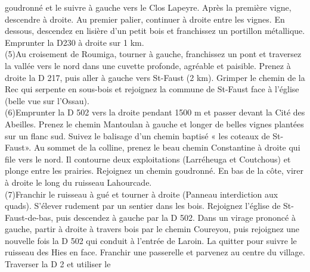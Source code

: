 \documentclass{article}
\begin{document}
                                goudronné et le suivre à gauche vers le Clos Lapeyre. Après la
                                première vigne, descendre à droite. Au premier palier, continuer à
                                droite entre les vignes. En dessous, descendez en lisière d'un petit
                                bois et franchissez un portillon métallique. Emprunter la D230 à
                                droite sur 1 km. \\(5)\indent Au croisement de Roumiga, tourner à gauche, franchissez
                                un pont et traversez la vallée vers le nord dans une cuvette
                                profonde, agréable et paisible. Prenez à droite la D 217, puis aller
                                à gauche vers St-Faust (2 km). Grimper le chemin de la Rec qui
                                serpente en sous-bois et rejoignez la commune de St-Faust face à
                                l'église (belle vue sur l'Ossau). \\(6)\indent Emprunter la D 502 vers la droite pendant 1500 m et
                                passer devant la Cité des Abeilles. Prenez le chemin Mantoulan à
                                gauche et longer de belles vignes plantées sur un flanc sud. Suivez
                                le balisage d'un chemin baptisé « les coteaux de St-Faust». Au
                                sommet de la colline, prenez le beau chemin Constantine à droite qui
                                file vers le nord. Il contourne deux exploitations (Larréheuga et
                                Coutchous) et plonge entre les prairies. Rejoignez un chemin
                                goudronné. En bas de la côte, virer à droite le long du ruisseau
                                Lahourcade. \\(7)\indent Franchir le ruisseau à gué et tourner à droite (Panneau
                                interdiction aux quads). S'élever rudement par un sentier dans les
                                bois. Rejoignez l'église de St-Faust-de-bas, puis descendez à gauche
                                par la D 502. Dans un virage prononcé à gauche, partir à droite à
                                travers bois par le chemin Coureyou, puis rejoignez une nouvelle
                                fois la D 502 qui conduit à l'entrée de Laroin. La quitter pour
                                suivre le ruisseau des Hies en face. Franchir une passerelle et
                                parvenez au centre du village. Traverser la D 2 et utiliser le
\end{document}
